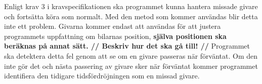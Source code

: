 Enligt krav 3 i kravspecifikationen ska programmet kunna hantera missade givare
och fortsätta köra som normalt. Med den metod som kommer användas blir detta inte ett problem.
Givarna kommer endast att användas för att justera programmets uppfattning om bilarnas position, 
\textbf{själva positionen ska beräknas på annat sätt. //    Beskriv hur det ska gå till!   //} Programmet ska detektera detta
fel genom att  se om en givare passeras när förväntat. Om den inte gör det och nästa
passering av givare sker när förväntat kommer programmet
identifiera den tidigare tidsfördröjningen som en missad givare.
